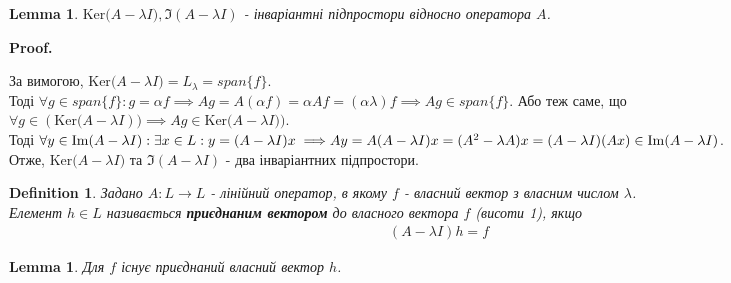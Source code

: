 \documentclass[a4paper, 10pt]{article}
\makeatletter
\def\qed{$\blacksquare$}
\def\ker#1{\textrm{Ker} {#1}}
\theoremstyle{theoremdd}
\theoremstyle{theoremdd}
\newtheorem{definition}[theorem]{Definition}
\theoremstyle{theoremdd}
\theoremstyle{theoremdd}
\theoremstyle{theoremdd}
\theoremstyle{theoremdd}
\theoremstyle{theoremdd}
\newtheorem{lemma}[theorem]{Lemma}
\theoremstyle{theoremdd}
\renewenvironment{proof}[1][Proof.\\]{\par
\pushQED{\hfill \qed}%
\normalfont \topsep6\p@\@plus6\p@\relax
\trivlist
\item\relax
{\bfseries
#1\@addpunct{.}}\hspace\labelsep\ignorespaces
}{%
\popQED\endtrivlist\@endpefalse
}
\makeatother
\begin{document}
\begin{lemma}
$\ker(A - \lambda I), \Im(A-\lambda I)$ - інваріантні підпростори відносно оператора $A$.
\end{lemma}

\begin{proof}
За вимогою, $\ker(A-\lambda I) = L_{\lambda} = span\{f\}$.\\
Тоді $\forall g \in span\{f\}: g = \alpha f \implies Ag = A(\alpha f) = \alpha Af = (\alpha \lambda) f \implies Ag \in span\{f\}$. Або теж саме, що $\forall g \in (\ker(A - \lambda I)) \implies Ag \in  \ker(A - \lambda I))$.
\bigskip \\
Тоді $\forall y \in \Im(A-\lambda I): \exists x \in L: y = (A-\lambda I)x \implies \\ Ay = A(A-\lambda I)x = (A^2-\lambda A)x = (A-\lambda I)(Ax) \in \Im(A-\lambda I)$.\\
Отже, $\ker(A-\lambda I)$ та $\Im(A-\lambda I)$ - два інваріантних підпростори.
\end{proof}

\begin{definition}
Задано $A: L \to L$ - лінійний оператор, в якому $f$ - власний вектор з власним числом $\lambda$.\\
Елемент $h \in L$ називається \textbf{приєднаним вектором} до власного вектора $f$ (висоти 1), якщо
\begin{align*}
(A-\lambda I)h = f
\end{align*}
\end{definition}

\begin{lemma}
Для $f$ існує приєднаний власний вектор $h$.
\end{lemma}
\end{document}
